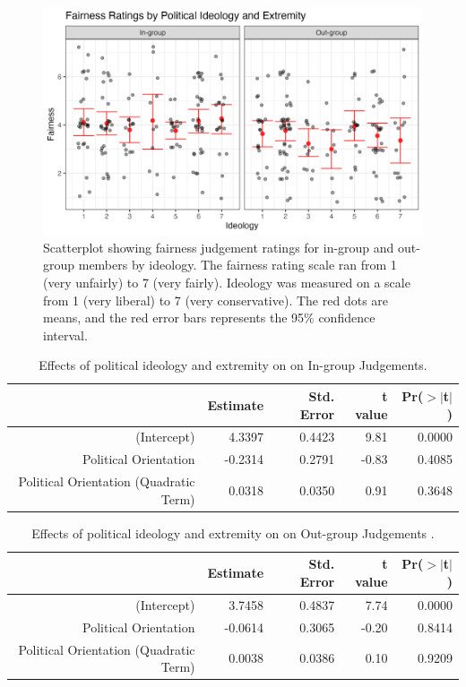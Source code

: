 \documentclass[12pt,]{article}
\begin{document}
\begin{figure}
	\centering
	\includegraphics{Plots/Study2_ideology_extremity.png}
	\caption{Scatterplot showing fairness judgement ratings for in-group and out-group members by ideology. The fairness rating scale ran from 1 (very unfairly) to 7 (very fairly). Ideology was measured on a scale from 1 (very liberal) to 7 (very conservative). The red dots are means, and the red error bars represents the 95\% confidence interval.}
	\label{fig:CID_allS1}
\end{figure}


\begin{table}[ht]
\centering
\begin{tabular}{rrrrr}
  \hline
 & Estimate & Std. Error & t value & Pr($>$$|$t$|$) \\ 
  \hline
(Intercept) & 4.3397 & 0.4423 & 9.81 & 0.0000 \\ 
  Political Orientation & -0.2314 & 0.2791 & -0.83 & 0.4085 \\ 
  Political Orientation (Quadratic Term) & 0.0318 & 0.0350 & 0.91 & 0.3648 \\ 
   \hline
\end{tabular}
\caption{Effects of political ideology and extremity on on In-group Judgements. } 
\label{ideo_ingroup2}
\end{table}

\clearpage

\begin{table}[ht]
\centering
\begin{tabular}{rrrrr}
  \hline
 & Estimate & Std. Error & t value & Pr($>$$|$t$|$) \\ 
  \hline
(Intercept) & 3.7458 & 0.4837 & 7.74 & 0.0000 \\ 
  Political Orientation & -0.0614 & 0.3065 & -0.20 & 0.8414 \\ 
  Political Orientation (Quadratic Term) & 0.0038 & 0.0386 & 0.10 & 0.9209 \\ 
   \hline
\end{tabular}
\caption{Effects of political ideology and extremity on on Out-group Judgements .} 
\label{ideo_outgroup2}
\end{table}
\end{document}
